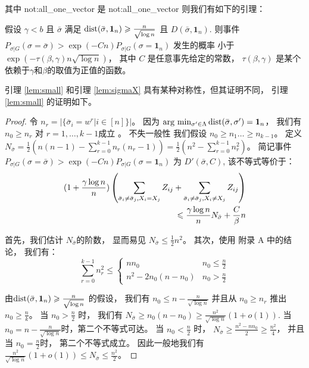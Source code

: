 其中 \gls{not:all_one_vector} 是 \glsdesc{not:all_one_vector} %
则我们有如下的引理：
 \begin{lemma}\label{lem:small}
	假设 $\gamma < b $ 且 $\bar{\sigma}$
  满足 
  $\Dist(\bar{\sigma}, \mathbf{1}_n) \geq \frac{n}{\sqrt{\log  n}}$
	且 $D(\bar{\sigma}, \mathbf{1}_n)$.
	则事件
	$P_{\sigma | G}(\sigma = \bar{\sigma} ) > \exp(-Cn) P_{\sigma | G}(\sigma = \mathbf{1}_n)$
	发生的概率 小于 $\exp(-\tau(\beta, \gamma) n \sqrt{\log  n} )$，
  其中 $C$ 是任意事先给定的常数，
  $\tau(\beta, \gamma)$ 是某个依赖于$\gamma$和$\beta$的取值为正值的函数。
\end{lemma}
引理 \ref{lem:small} 和引理 \ref{lem:sigmaX}  具有某种对称性，但其证明不同，
引理 \ref{lem:small} 的证明如下。
\begin{proof}
	令 $n_r = |\{\bar{\sigma}_i = w^r | i\in [n] \}|$。
  因为 $\arg\,\min_{\sigma'\in \Lambda} \Dist(\bar{\sigma}, \sigma') = \mathbf{1}_n$，
  我们有 $n_0 \geq n_r$ 对 $r=1, \dots, k-1$成立 
  。
	不失一般性 我们假设 \mbox{$n_0 \geq n_1 \dots \geq n_{k-1}$}。
	定义
  $N_{\bar{\sigma}} = \frac{1}{2}(n(n-1) - \sum_{r=0}^{k-1} n_r(n_r-1))
	=\frac{1}{2}(n^2 - \sum_{r=0}^{k-1} n_r^2)$。
	简记事件
  $P_{\sigma | G}(\sigma = \bar{\sigma} ) > \exp(-Cn) P_{\sigma | G}(\sigma = \mathbf{1}_n)$ 为
  $D'(\bar{\sigma}, C)$,
	该不等式等价于：
\begin{align}
	(1 + \frac{\gamma \log n}{n})
	\left( \sum_{\bar{\sigma}_i  \neq \bar{\sigma}_j, X_i = X_j} Z_{ij} +
	\sum_{\bar{\sigma}_i  \neq \bar{\sigma}_j, X_i \neq X_j} Z_{ij} \right)\notag\\
	\leq \frac{\gamma \log n}{n} N_{\bar{\sigma}} + \frac{C}{\beta} n\label{eq:small}
\end{align}
		
	首先，我们估计 $N_{\bar{\sigma}}$的阶数，
  显而易见 $N_{\bar{\sigma}} \leq \frac{1}{2} n^2$。
	其次，使用 \citet{chen2016information} 附录 A 中的结论，
  我们有：
\begin{equation}
	\sum_{r=0}^{k-1} n_r^2 \leq
	\begin{cases}
	n n_0 & n_0 \leq \frac{n}{2} \\
	n^2 - 2n_0(n-n_0) & n_0 > \frac{n}{2}
	\end{cases}
	\end{equation}
	
	由$\Dist(\bar{\sigma}, \mathbf{1}_n) \geq \frac{n}{\sqrt{\log n}}$
  的假设，
  我们有 $n_0 \leq n - \frac{n}{\sqrt{\log n}}$
	并且从 $n_0 \geq n_r$ 推出 $n_0 \geq \frac{n}{k}$。
	当 $n_0 > \frac{n}{2}$ 时，
	我们有
  $N_{\bar{\sigma}} \geq n_0 (n - n_0) \geq \frac{n^2}{\sqrt{\log n}}(1+o(1))$.
	当 $n_0 = n - \frac{n}{\sqrt{\log n}}$时，第二个不等式可达。
  当 $n_0 < \frac{n}{2}$ 时，
	$N_{\bar{\sigma}} \geq \frac{n^2 - nn_0}{2} \geq \frac{n^2}{4}$，
  并且当 $n_0 = \frac{n}{2}$时，
  第二个不等式成立。
	因此一般地我们有 $\frac{n^2}{\sqrt{\log n}}(1+o(1)) \leq N_{\bar{\sigma}} \leq \frac{n^2}{2}$。
	

\end{proof}
